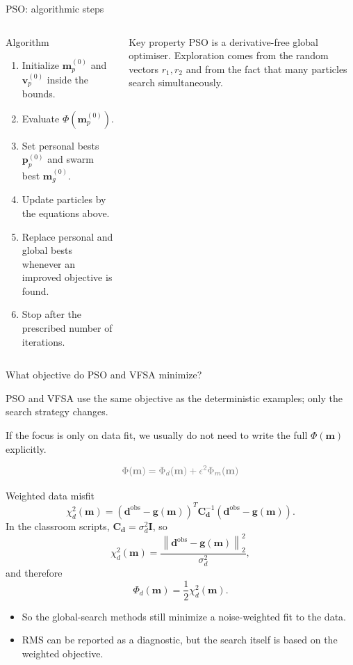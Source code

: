 \documentclass[aspectratio=169]{beamer}
\newcommand{\mat}[1]{{\mathbf{#1}}}
\renewcommand{\vec}[1]{\mathbf{#1}}
\newcommand{\dd}{ {\vec{d}} }
\newcommand{\dobs}{{\vec{d}^{\text{obs}}}}
\newcommand{\mm}{ {\vec{m}} }
\renewcommand{\gg}[1]{\vec{g}\left(#1\right)}
\newcommand{\II}{\mat{I}}
\newcommand{\Cd}{\mat{C}_{\dd}}
\begin{document}
\begin{frame}{PSO: algorithmic steps}
\small

\begin{columns}[T]
\begin{block}{Algorithm}
\begin{enumerate}
    \item[--] Initialize $\mm_p^{(0)}$ and $\vec{v}_p^{(0)}$ inside the bounds.
    \item[--] Evaluate $\Phi(\mm_p^{(0)})$.
    \item[--] Set personal bests $\vec{p}_p^{(0)}$ and swarm best $\mm_g^{(0)}$.
    \item[--] Update particles by the equations above.
    \item[--] Replace personal and global bests whenever an improved objective is found.
    \item[--] Stop after the prescribed number of iterations.
\end{enumerate}
\end{block}

\begin{alertblock}{Key property}
PSO is a \alert{derivative-free} global optimiser. Exploration comes from the random vectors $r_1,r_2$ and from the fact that many particles search simultaneously.
\end{alertblock}
\end{columns}
\end{frame}

\begin{frame}{What objective do PSO and VFSA minimize?}
\footnotesize

PSO and VFSA use the same objective as the deterministic examples; only the search strategy changes.

If the focus is only on data fit, we usually do not need to write the full $\Phi(\mm)$ explicitly.

\[
\textcolor{gray}{\Phi(\mm)=\Phi_d(\mm)+\epsilon^2\Phi_m(\mm)}
\]

\begin{alertblock}{Weighted data misfit}
\[
\chi_d^2(\mm)
=
\left(\dobs-\gg{\mm}\right)^T\Cd^{-1}\left(\dobs-\gg{\mm}\right).
\]
In the classroom scripts, $\Cd=\sigma_d^2\II$, so
\[
\chi_d^2(\mm)
=
\frac{\left\|\dobs-\gg{\mm}\right\|_2^2}{\sigma_d^2},
\]
and therefore
\[
\Phi_d(\mm)=\frac{1}{2}\chi_d^2(\mm).
\]
\end{alertblock}

\begin{itemize}
    \item[--] So the global-search methods still minimize a noise-weighted fit to the data.
    \item[--] RMS can be reported as a diagnostic, but the search itself is based on the weighted objective.
\end{itemize}
\end{frame}
\end{document}
